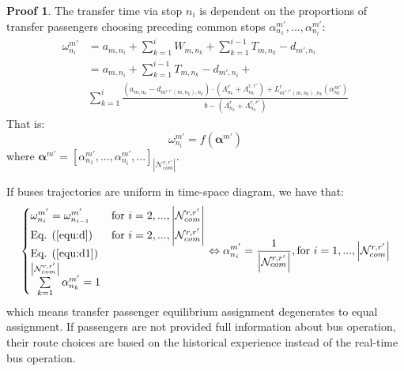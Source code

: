 \documentclass[fleqn]{article}
\newcounter{proof}
\theoremstyle{definition} \newtheorem*{myproof}{Proof}
\begin{document}
\begin{myproof}
    The transfer time via stop $n_{i}$ is dependent on the proportions of transfer passengers choosing preceding common stops
    $\alpha_{n_{1}}^{m'},...,\alpha_{n_{i}}^{m'}$:
    \begin{equation}
        \begin{split}
            \omega_{n_i}^{m'}  &= a_{m,n_{i}} + \sum_{k=1}^{i} W_{m,n_{k}} + \sum_{k=1}^{i-1} T_{m,n_{k}}-d_{m',n_{i}} \\
            &= a_{m,n_{i}} + \sum_{k=1}^{i-1} T_{m,n_{k}}-d_{m',n_{i}} + \\
            &\sum_{k=1}^{i} \frac{\left(a_{m,n_{k}}-d_{m^{r,r'}(m,n_{k}),n_{k}}\right)\cdot \left(\Lambda_{n_{k}}^{r}+\Lambda_{n_{k}}^{r,r'}\right)
            +L_{m^{r,r'}(m,n_{k}),n_{k}}^{r}\left(\alpha_{n_k}^{m'}\right)}
            {b-\left(\Lambda_{n_{k}}^{r}+\Lambda_{n_{k}}^{r,r'}\right)}        
        \end{split}
    \end{equation}
    That is:
    \begin{equation}
        \omega_{n_i}^{m'} = f\left(\boldsymbol{\alpha}^{m'}\right)
    \end{equation}
    where $\boldsymbol{\alpha}^{m'} = \left[\alpha_{n_{1}}^{m'},...,\alpha_{n_{i}}^{m'},... \right]_{\left|\mathcal{N}_{com}^{r,r'}\right|}$. 
    
    If buses trajectories are uniform in time-space diagram, we have that:
    \begin{equation}
        \begin{cases}
            \omega_{n_{i}}^{m'} = \omega_{n_{i-1}}^{m'} & \text{for } i=2,...,\left|\mathcal{N}_{com}^{r,r'}\right|\\
            \text{Eq. (\ref{equ:d})} & \text{for }i=2,...,\left|\mathcal{N}_{com}^{r,r'}\right|\\
            \text{Eq. (\ref{equ:d1})} \\
            \sum\limits_{k=1}^{\left|\mathcal{N}_{com}^{r,r'}\right|} \alpha_{n_{k}}^{m'} = 1
        \end{cases}
        \Leftrightarrow
        \alpha_{n_{i}}^{m'} = \frac{1}{\left|\mathcal{N}_{com}^{r,r'}\right|},\text{for }i=1,...,\left|\mathcal{N}_{com}^{r,r'}\right|
    \end{equation} 
    which means transfer passenger equilibrium assignment degenerates to equal assignment. 
    If passengers are not provided full information about bus operation, 
    their route choices are based on the historical experience instead of the real-time bus operation. 
    \end{myproof}
\end{document}
